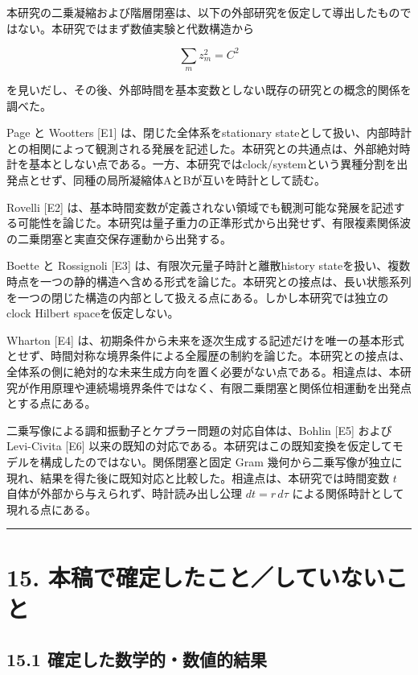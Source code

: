 \documentclass[
  a4paper,
]{ltjsarticle}
\begin{document}
本研究の二乗凝縮および階層閉塞は、以下の外部研究を仮定して導出したものではない。本研究ではまず数値実験と代数構造から

\[
\sum_mz_m^2=C^2
\]

を見いだし、その後、外部時間を基本変数としない既存の研究との概念的関係を調べた。

Page と Wootters {[}E1{]} は、閉じた全体系をstationary
stateとして扱い、内部時計との相関によって観測される発展を記述した。本研究との共通点は、外部絶対時計を基本としない点である。一方、本研究ではclock/systemという異種分割を出発点とせず、同種の局所凝縮体AとBが互いを時計として読む。

Rovelli {[}E2{]}
は、基本時間変数が定義されない領域でも観測可能な発展を記述する可能性を論じた。本研究は量子重力の正準形式から出発せず、有限複素関係波の二乗閉塞と実直交保存運動から出発する。

Boette と Rossignoli {[}E3{]} は、有限次元量子時計と離散history
stateを扱い、複数時点を一つの静的構造へ含める形式を論じた。本研究との接点は、長い状態系列を一つの閉じた構造の内部として扱える点にある。しかし本研究では独立のclock
Hilbert spaceを仮定しない。

Wharton {[}E4{]}
は、初期条件から未来を逐次生成する記述だけを唯一の基本形式とせず、時間対称な境界条件による全履歴の制約を論じた。本研究との接点は、全体系の側に絶対的な未来生成方向を置く必要がない点である。相違点は、本研究が作用原理や連続場境界条件ではなく、有限二乗閉塞と関係位相運動を出発点とする点にある。

二乗写像による調和振動子とケプラー問題の対応自体は、Bohlin {[}E5{]}
および Levi-Civita {[}E6{]}
以来の既知の対応である。本研究はこの既知変換を仮定してモデルを構成したのではない。関係閉塞と固定
Gram
幾何から二乗写像が独立に現れ、結果を得た後に既知対応と比較した。相違点は、本研究では時間変数
\(t\) 自体が外部から与えられず、時計読み出し公理 \(dt=r\,d\tau\)
による関係時計として現れる点にある。

\begin{center}\rule{0.5\linewidth}{0.5pt}\end{center}

\section{15.
本稿で確定したこと／していないこと}\label{ux672cux7a3fux3067ux78baux5b9aux3057ux305fux3053ux3068ux3057ux3066ux3044ux306aux3044ux3053ux3068}

\subsection{15.1
確定した数学的・数値的結果}\label{ux78baux5b9aux3057ux305fux6570ux5b66ux7684ux6570ux5024ux7684ux7d50ux679c}
\end{document}
